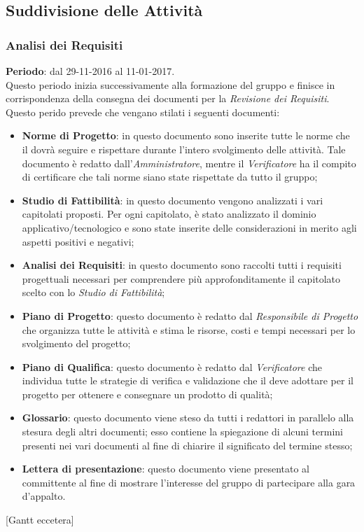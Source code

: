 \subsection{Suddivisione delle Attività}
	\subsubsection{Analisi dei Requisiti}
	\textbf{Periodo}: dal 29-11-2016 al 11-01-2017.
	\\ Questo periodo inizia successivamente alla formazione del gruppo e finisce in corrispondenza della consegna dei documenti per la \textit{Revisione dei Requisiti}.
	Questo perido prevede che vengano stilati i seguenti documenti:
	\begin{itemize}
		\item \textbf{Norme di Progetto}: in questo documento sono inserite tutte le norme che il  dovrà seguire e rispettare durante l'intero svolgimento delle attività. Tale documento è redatto dall'\textit{Amministratore}, mentre il \textit{Verificatore} ha il compito di certificare che tali norme siano state rispettate da tutto il gruppo;
		\item \textbf{Studio di Fattibilità}: in questo documento vengono analizzati i vari capitolati proposti. Per ogni capitolato, è stato analizzato il dominio applicativo/tecnologico e sono state inserite delle considerazioni in merito agli aspetti positivi e negativi;
		\item \textbf{Analisi dei Requisiti}: in questo documento sono raccolti tutti i requisiti progettuali necessari per comprendere più approfonditamente	il capitolato scelto con lo \textit{Studio di Fattibilità};
		\item \textbf{Piano di Progetto}: questo documento è redatto dal \textit{Responsibile di Progetto} che organizza tutte le attività e stima le risorse, costi e tempi necessari per lo svolgimento del progetto;
		\item \textbf{Piano di Qualifica}: questo documento è redatto dal \textit{Verificatore} che individua tutte le strategie di verifica e validazione che il  deve adottare per il progetto per ottenere e consegnare un prodotto di qualità;
		\item \textbf{Glossario}: questo documento viene steso da tutti i redattori in parallelo alla stesura degli altri documenti; esso contiene la spiegazione di alcuni termini presenti nei vari documenti al fine di chiarire il significato del termine stesso;
		\item \textbf{Lettera di presentazione}: questo documento viene presentato al committente al fine di mostrare l'interesse del gruppo di partecipare alla gara d'appalto.
	\end{itemize}
	[Gantt eccetera]
